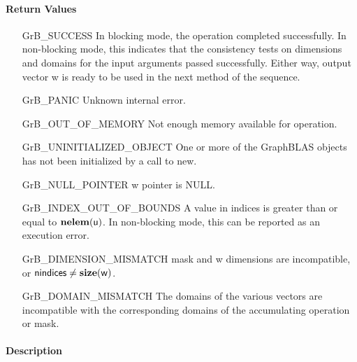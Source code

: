 \paragraph{Return Values}

\begin{itemize}[leftmargin=2.1in]
    \item[{\sf GrB\_SUCCESS}]         In blocking mode, the operation completed
    successfully. In non-blocking mode, this indicates that the consistency 
    tests on dimensions and domains for the input arguments passed successfully. 
    Either way, output vector {\sf w} is ready to be used in the next method of 
    the sequence.

    \item[{\sf GrB\_PANIC}]            Unknown internal error.
    
    \item[{\sf GrB\_OUT\_OF\_MEMORY}]  Not enough memory available for operation.
    
    \item[{\sf GrB\_UNINITIALIZED\_OBJECT}]  One or more of the GraphBLAS 
    objects has not been initialized by a call to {\sf new}.
    
    \item[{\sf GrB\_NULL\_POINTER}]  {\sf w} pointer is {\sf NULL}. 

    \item[{\sf GrB\_INDEX\_OUT\_OF\_BOUNDS}]  A value in {\sf indices} is greater 
    than or equal to $\bold{nelem}({\sf u})$.  In non-blocking mode, this can be
    reported as an execution error.
    
    \item[{\sf GrB\_DIMENSION\_MISMATCH}]  {\sf mask} and {\sf w} dimensions are
    incompatible, or ${\sf nindices} \neq \bold{size}({\sf w})$. 
    
    \item[{\sf GrB\_DOMAIN\_MISMATCH}]    The domains of the various vectors are
	incompatible with the corresponding domains of the accumulating operation or 
    mask.
\end{itemize}

\paragraph{Description}

